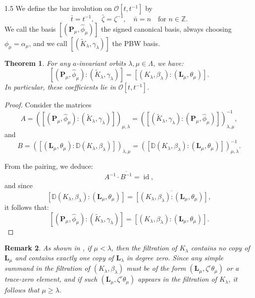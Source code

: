 \documentclass[10pt]{amsart}
\newtheorem{theorem}{Theorem}[section]
\newtheorem{remark}[theorem]{Remark}
\begin{document}
\begin{spacing}{1.5}
We define the bar involution on $\mathcal{O}[t, t^{-1}]$ by
\[
\bar{t} = t^{-1},\quad \bar{\zeta} = \zeta^{-1},\quad \bar{n} = n \quad \text{for } n \in \mathbb{Z}.
\]
We call the basis $[(\mathbf{P}_{\mu}, \hat{\phi}_{\mu})]$ the signed canonical basis, always choosing $\phi_{\mu}=\alpha_{\mu}$, and we call $[(\widetilde{K}_{\lambda}, \gamma_{\lambda})]$ the PBW basis.
\begin{theorem}
    For any $a$-invariant orbits $\lambda,\mu \in \Lambda$, we have:
    \[
        [(\mathbf{P}_{\mu}, \hat{\phi}_{\mu}):(\widetilde{K}_{\lambda}, \gamma_{\lambda})] = [(K_{\lambda}, \beta_{\lambda}):(\mathbf{L}_{\mu}, \theta_{\mu})].
    \]
    In particular, these coefficients lie in $\mathcal{O}[t, t^{-1}]$.
\end{theorem}

\begin{proof}
    Consider the matrices
    \[
    A = \left( [(\mathbf{P}_{\mu}, \hat{\phi}_{\mu}):(\widetilde{K}_{\lambda}, \gamma_{\lambda})] \right)_{\mu,\lambda} = \left( [(\widetilde{K}_{\lambda}, \gamma_{\lambda}):(\mathbf{P}_{\mu}, \hat{\phi}_{\mu})] \right)_{\lambda,\mu}^{-1},
    \]
    and
    \[
    B = \left( [(\mathbf{L}_{\mu}, \theta_{\mu}):\mathbb{D}(K_{\lambda}, \beta_{\lambda})] \right)_{\lambda,\mu} = \left( [\mathbb{D}(K_{\lambda}, \beta_{\lambda}):(\mathbf{L}_{\mu}, \theta_{\mu})] \right)_{\mu,\lambda}^{-1}.
    \]

    From the pairing, we deduce:
    \[
    A^{-1} \cdot \overline{B^{-1}} = \operatorname{id},
    \]
    and since
    \[
    [\mathbb{D}(K_{\lambda}, \beta_{\lambda}):(\mathbf{L}_{\mu}, \theta_{\mu})] = \overline{[(K_{\lambda}, \beta_{\lambda}):(\mathbf{L}_{\mu}, \theta_{\mu})]},
    \]
    it follows that:
    \[
    [(\mathbf{P}_{\mu}, \hat{\phi}_{\mu}):(\widetilde{K}_{\lambda}, \gamma_{\lambda})] = [(K_{\lambda}, \beta_{\lambda}):(\mathbf{L}_{\mu}, \theta_{\mu})].
    \]
\end{proof}

\begin{remark}
    As shown in \cite{cd088214-009e-3813-9a86-97f9a299a24c}, if $\mu < \lambda$, then the filtration of $K_{\lambda}$ contains no copy of $\mathbf{L}_{\mu}$ and contains exactly one copy of $\mathbf{L}_{\lambda}$ in degree zero. Since any simple summand in the filtration of $(K_{\lambda}, \beta_{\lambda})$ must be of the form $(\mathbf{L}_{\mu}, \zeta^r \theta_{\mu})$ or a trace-zero element, and if such $(\mathbf{L}_{\mu},\zeta^r \theta_{\mu})$ appears in the filtration of $K_{\lambda}$, it follows that $\mu \geq \lambda$.


\end{remark}
\end{spacing}
\end{document}
